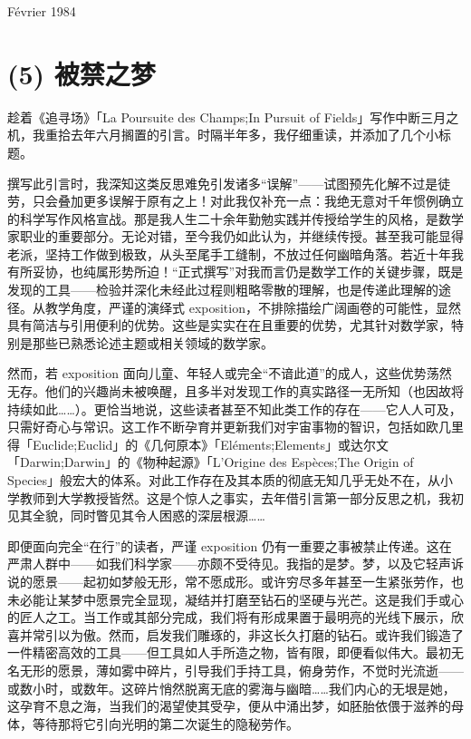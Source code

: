 Février 1984

\section{(5) 被禁之梦}

趁着《追寻场》「La Poursuite des Champs;In Pursuit of Fields」写作中断三月之机，我重拾去年六月搁置的引言。时隔半年多，我仔细重读，并添加了几个小标题。

撰写此引言时，我深知这类反思难免引发诸多“误解”——试图预先化解不过是徒劳，只会叠加更多误解于原有之上！对此我仅补充一点：我绝无意对千年惯例确立的科学写作风格宣战。那是我人生二十余年勤勉实践并传授给学生的风格，是数学家职业的重要部分。无论对错，至今我仍如此认为，并继续传授。甚至我可能显得老派，坚持工作做到极致，从头至尾手工缝制，不放过任何幽暗角落。若近十年我有所妥协，也纯属形势所迫！“正式撰写”对我而言仍是数学工作的关键步骤，既是发现的工具——检验并深化未经此过程则粗略零散的理解，也是传递此理解的途径。从教学角度，严谨的演绎式 exposition，不排除描绘广阔画卷的可能性，显然具有简洁与引用便利的优势。这些是实实在在且重要的优势，尤其针对数学家，特别是那些已熟悉论述主题或相关领域的数学家。

然而，若 exposition 面向儿童、年轻人或完全“不谙此道”的成人，这些优势荡然无存。他们的兴趣尚未被唤醒，且多半对发现工作的真实路径一无所知（也因故将持续如此……）。更恰当地说，这些读者甚至不知此类工作的存在——它人人可及，只需好奇心与常识。这工作不断孕育并更新我们对宇宙事物的智识，包括如欧几里得「Euclide;Euclid」的《几何原本》「Eléments;Elements」或达尔文「Darwin;Darwin」的《物种起源》「L'Origine des Espèces;The Origin of Species」般宏大的体系。对此工作存在及其本质的彻底无知几乎无处不在，从小学教师到大学教授皆然。这是个惊人之事实，去年借引言第一部分反思之机，我初见其全貌，同时瞥见其令人困惑的深层根源……

即便面向完全“在行”的读者，严谨 exposition 仍有一重要之事被禁止传递。这在严肃人群中——如我们科学家——亦颇不受待见。我指的是梦。梦，以及它轻声诉说的愿景——起初如梦般无形，常不愿成形。或许穷尽多年甚至一生紧张劳作，也未必能让某梦中愿景完全显现，凝结并打磨至钻石的坚硬与光芒。这是我们手或心的匠人之工。当工作或其部分完成，我们将有形成果置于最明亮的光线下展示，欣喜并常引以为傲。然而，启发我们雕琢的，非这长久打磨的钻石。或许我们锻造了一件精密高效的工具——但工具如人手所造之物，皆有限，即便看似伟大。最初无名无形的愿景，薄如雾中碎片，引导我们手持工具，俯身劳作，不觉时光流逝——或数小时，或数年。这碎片悄然脱离无底的雾海与幽暗……我们内心的无垠是她，这孕育不息之海，当我们的渴望使其受孕，便从中涌出梦，如胚胎依偎于滋养的母体，等待那将它引向光明的第二次诞生的隐秘劳作。

